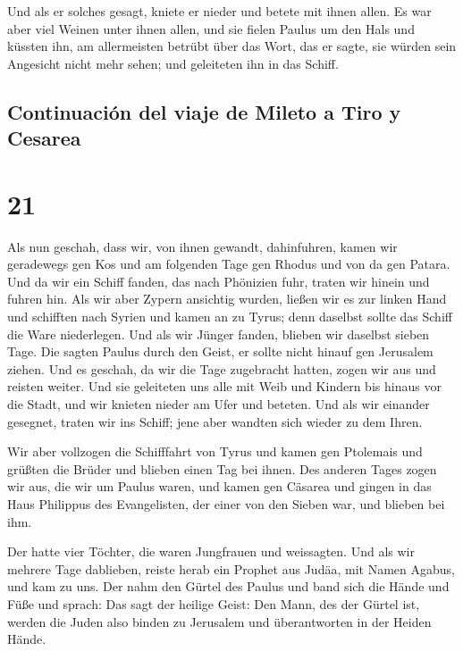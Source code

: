  Und als er solches gesagt, kniete er nieder und betete
mit ihnen allen.  Es war aber viel Weinen unter ihnen
allen, und sie fielen Paulus um den Hals und küssten ihn,
 am allermeisten betrübt über das Wort, das er sagte, sie
würden sein Angesicht nicht mehr sehen; und geleiteten ihn in das
Schiff.

\hypertarget{continuaciuxf3n-del-viaje-de-mileto-a-tiro-y-cesarea}{%
\subsection{Continuación del viaje de Mileto a Tiro y
Cesarea}\label{continuaciuxf3n-del-viaje-de-mileto-a-tiro-y-cesarea}}

\hypertarget{section-20}{%
\section{21}\label{section-20}}

 Als nun geschah, dass wir, von ihnen gewandt,
dahinfuhren, kamen wir geradewegs gen Kos und am folgenden Tage gen
Rhodus und von da gen Patara.  Und da wir ein Schiff
fanden, das nach Phönizien fuhr, traten wir hinein und fuhren hin.
 Als wir aber Zypern ansichtig wurden, ließen wir es zur
linken Hand und schifften nach Syrien und kamen an zu Tyrus; denn
daselbst sollte das Schiff die Ware niederlegen.  Und als
wir Jünger fanden, blieben wir daselbst sieben Tage. Die sagten Paulus
durch den Geist, er sollte nicht hinauf gen Jerusalem ziehen.
 Und es geschah, da wir die Tage zugebracht hatten, zogen
wir aus und reisten weiter. Und sie geleiteten uns alle mit Weib und
Kindern bis hinaus vor die Stadt, und wir knieten nieder am Ufer und
beteten.  Und als wir einander gesegnet, traten wir ins
Schiff; jene aber wandten sich wieder zu dem Ihren.

 Wir aber vollzogen die Schifffahrt von Tyrus und kamen
gen Ptolemais und grüßten die Brüder und blieben einen Tag bei ihnen.
 Des anderen Tages zogen wir aus, die wir um Paulus waren,
und kamen gen Cäsarea und gingen in das Haus Philippus des Evangelisten,
der einer von den Sieben war, und blieben bei ihm.

 Der hatte vier Töchter, die waren Jungfrauen und
weissagten.  Und als wir mehrere Tage dablieben, reiste
herab ein Prophet aus Judäa, mit Namen Agabus, und kam zu uns.
 Der nahm den Gürtel des Paulus und band sich die Hände
und Füße und sprach: Das sagt der heilige Geist: Den Mann, des der
Gürtel ist, werden die Juden also binden zu Jerusalem und überantworten
in der Heiden Hände.

